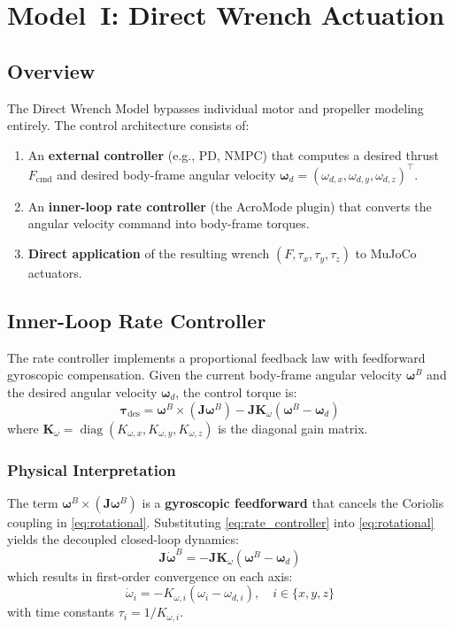 \documentclass[journal]{IEEEtran}
\newcommand{\J}{\mathbf{J}}
\newcommand{\bomega}{\boldsymbol{\omega}}
\newcommand{\btau}{\boldsymbol{\tau}}
\newcommand{\diag}{\operatorname{diag}}
\begin{document}
\section{Model~I: Direct Wrench Actuation}
\label{sec:model1}

\subsection{Overview}

The Direct Wrench Model bypasses individual motor and propeller modeling entirely. The control architecture consists of:
\begin{enumerate}
  \item An \textbf{external controller} (e.g., PD, NMPC) that computes a desired thrust $F_{\text{cmd}}$ and desired body-frame angular velocity $\bomega_d = (\omega_{d,x}, \omega_{d,y}, \omega_{d,z})^\top$.
  \item An \textbf{inner-loop rate controller} (the AcroMode plugin) that converts the angular velocity command into body-frame torques.
  \item \textbf{Direct application} of the resulting wrench $(F, \tau_x, \tau_y, \tau_z)$ to MuJoCo actuators.
\end{enumerate}

\subsection{Inner-Loop Rate Controller}

The rate controller implements a proportional feedback law with feedforward gyroscopic compensation. Given the current body-frame angular velocity $\bomega^B$ and the desired angular velocity $\bomega_d$, the control torque is:
\begin{equation}
  \btau_{\text{des}} = \bomega^B \times (\J \bomega^B) - \J \mathbf{K}_{\omega} (\bomega^B - \bomega_d)
  \label{eq:rate_controller}
\end{equation}
where $\mathbf{K}_{\omega} = \diag(K_{\omega,x}, K_{\omega,y}, K_{\omega,z})$ is the diagonal gain matrix.

\subsubsection{Physical Interpretation}

The term $\bomega^B \times (\J \bomega^B)$ is a \textbf{gyroscopic feedforward} that cancels the Coriolis coupling in \eqref{eq:rotational}. Substituting \eqref{eq:rate_controller} into \eqref{eq:rotational} yields the decoupled closed-loop dynamics:
\begin{equation}
  \J \dot{\bomega}^B = -\J \mathbf{K}_{\omega} (\bomega^B - \bomega_d)
  \label{eq:closed_loop_rate}
\end{equation}
which results in first-order convergence on each axis:
\begin{equation}
  \dot{\omega}_i = -K_{\omega,i} (\omega_i - \omega_{d,i}), \quad i \in \{x, y, z\}
  \label{eq:first_order}
\end{equation}
with time constants $\tau_i = 1 / K_{\omega,i}$.
\end{document}
